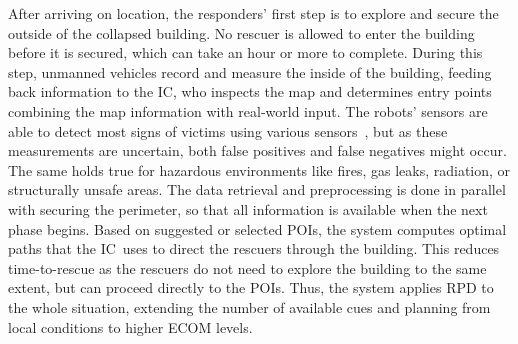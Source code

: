 \documentclass[conference,10pt,letter]{IEEEtran}
\def\IC{IC}
\begin{document}
%
%
After arriving on location, the responders' first step is to explore and secure the outside of the collapsed building. No rescuer is allowed to enter the building before it is secured, which can take an hour or more to complete. During this step, unmanned vehicles record and measure the inside of the building, feeding back information to the \IC , who inspects the map and determines entry points combining the map information with real-world input. The robots' sensors are able to detect most signs of victims using various sensors~\cite{Wu12Eulerian}, but as these measurements are uncertain, both false positives and false negatives might occur. The same holds true for hazardous environments like fires, gas leaks, radiation, or structurally unsafe areas. The data retrieval and preprocessing is done in parallel with securing the perimeter, so that all information is available when the next phase begins. Based on suggested or selected POIs, the system computes optimal paths that the \IC\ uses to direct the rescuers through the building. This reduces time-to-rescue as the rescuers do not need to explore the building to the same extent, but can proceed directly to the POIs. Thus, the system applies RPD to the whole situation, extending the number of available cues and planning from local conditions to higher ECOM levels.
\end{document}
